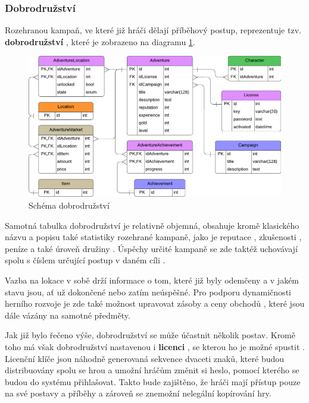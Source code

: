\subsubsection*{Dobrodružství}
\label{subsubsec:schema_adventure}

Rozehranou kampaň, ve které již hráči dělají příběhový postup, reprezentuje tzv. \textbf{dobrodružství} , které je zobrazeno na diagramu \ref{diag:er_adventure}.

\begin{figure}[h]
    \centering
    \includegraphics[scale=0.8]{../../shared/diagrams/er_adventure.pdf}
    \caption{Schéma dobrodružství}
    \label{diag:er_adventure}
\end{figure}

Samotná tabulka dobrodružství je relativně objemná, obsahuje kromě klasického názvu a popisu také statistiky rozehrané kampaně, jako je reputace , zkušenosti , peníze  a také úroveň družiny . Úspěchy určité kampaně  se zde taktéž uchovávají spolu s číslem určující postup v daném cíli .

Vazba na lokace  v sobě drží informace o tom, které již byly odemčeny  a v jakém stavu  jsou, ať už dokončené nebo zatím neúspěšné. Pro podporu dynamičnosti herního rozvoje je zde také možnost upravovat zásoby a ceny obchodů , které jsou dále vázány na samotné předměty.

Jak již bylo řečeno výše, dobrodružství se může účastnit několik postav. Kromě toho má však dobrodružství nastavenou i \textbf{licenci} , se kterou ho je možné spustit . Licenční klíče jsou náhodně generovaná sekvence dvaceti znaků, které budou distribuovány spolu se hrou a umožní hráčům změnit si heslo, pomocí kterého se budou do systému přihlašovat. Takto bude zajištěno, že hráči mají přístup pouze na své postavy a příběhy a zároveň se znemožní nelegální kopírování hry.


